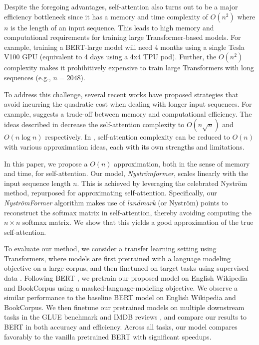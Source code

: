 Despite the foregoing advantages, self-attention also turns out to be a major efficiency bottleneck since it has a memory and time complexity of $O(n^2)$ where $n$ is the length of an input sequence. This leads to high memory and computational requirements for training large Transformer-based models. For example, training a BERT-large model \cite{devlin2019bert} will need 4 months using a single Tesla V100 GPU (equivalent to 4 days using a 4x4 TPU pod). Further, the $O(n^2)$ complexity makes it prohibitively expensive to train large Transformers with long sequences (e.g., $n=2048$). 

To address this challenge, several recent works have proposed strategies that avoid incurring the quadratic cost when dealing with longer input sequences. For example, \cite{dai2019transformer} suggests a trade-off between memory and computational efficiency. The ideas described in \cite{child2019generating,kitaev2019reformer} decrease the self-attention complexity to $O(n\sqrt{n})$ and $O(n\log n)$ respectively. In \cite{shen2018efficient,katharopoulos-et-al-2020,wang2020linformer}, self-attention complexity can be reduced to $O(n)$ with various approximation ideas, each with its own strengths and limitations. 

In this paper, we propose a $O(n)$ approximation, both in the sense of memory and time,  for self-attention. Our model, \textit{Nystr\"{o}mformer}, scales linearly with the input sequence length $n$. This is achieved by leveraging the celebrated Nystr\"{o}m method, repurposed for approximating self-attention. Specifically, our \textit{Nystr\"{o}mFormer} algorithm makes use of \textit{landmark} (or Nystr\"{o}m) points to reconstruct the softmax matrix in self-attention, thereby avoiding computing the $n\times n$ softmax matrix. We show that this yields a good approximation of the true self-attention.

To evaluate our method, we consider a transfer learning setting using Transformers, where models are first pretrained with a language modeling objective on a large corpus, and then finetuned on target tasks using supervised data \cite{devlin2019bert,liu2019roberta,lewis2019bart,wang2020linformer}. Following BERT \cite{devlin2019bert,liu2019roberta}, we pretrain our proposed model on English Wikipedia and BookCorpus \cite{zhu2015aligning} using a masked-language-modeling objective. We observe a similar performance to the baseline BERT model on English Wikipedia and BookCorpus. We then finetune our pretrained models on multiple downstream tasks in the GLUE benchmark \cite{wang2018glue} and IMDB reviews \cite{maas2011learning}, and compare our results to BERT in both accuracy and efficiency. Across all tasks, our model compares favorably to the vanilla pretrained BERT with significant speedups. 

